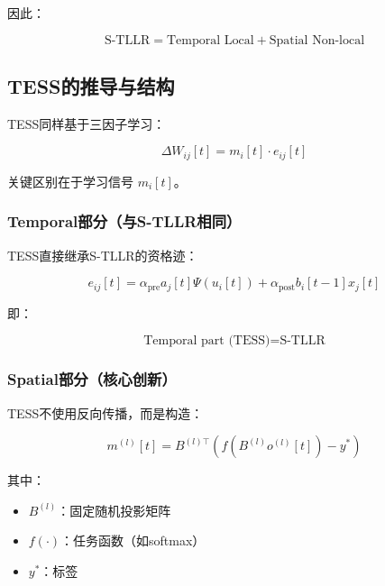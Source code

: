\documentclass[journal,12pt,onecolumn]{IEEEtran}
\begin{document}
因此：

\begin{equation}
\text{S-TLLR} = \text{Temporal Local} + \text{Spatial Non-local}
\end{equation}



\subsection{TESS的推导与结构}

TESS同样基于三因子学习：

\begin{equation}
\Delta W_{ij}[t] = m_i[t] \cdot e_{ij}[t]
\end{equation}

关键区别在于学习信号 $m_i[t]$。



\subsubsection{Temporal部分（与S-TLLR相同）}

TESS直接继承S-TLLR的资格迹：

\begin{equation}
e_{ij}[t] =
\alpha_{\text{pre}} a_j[t] \Psi(u_i[t])
+
\alpha_{\text{post}} b_i[t-1] x_j[t]
\end{equation}

即：

\begin{equation}
\text{Temporal part (TESS)} = \text{S-TLLR}
\end{equation}



\subsubsection{Spatial部分（核心创新）}

TESS不使用反向传播，而是构造：

\begin{equation}
m^{(l)}[t] = B^{(l)\top} \left( f(B^{(l)} o^{(l)}[t]) - y^* \right)
\end{equation}

其中：
\begin{itemize}
\item $B^{(l)}$：固定随机投影矩阵
\item $f(\cdot)$：任务函数（如softmax）
\item $y^*$：标签
\end{itemize}
\end{document}
